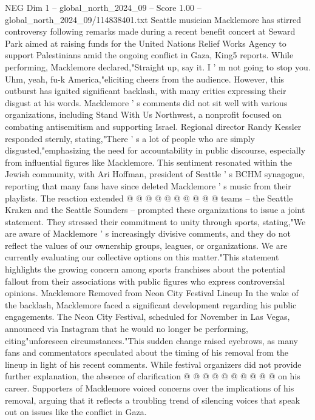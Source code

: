 \begin{textsample}{NEG Dim 1 – global\_north\_2024\_09 – Score 1.00 – global\_north\_2024\_09/114838401.txt}  \label{ex:f1_neg_021}
Seattle musician Macklemore has stirred controversy following remarks made during a recent benefit concert at Seward Park aimed at raising funds for the United Nations Relief Works Agency to support Palestinians amid the ongoing conflict in Gaza, King5 reports.
While performing, Macklemore declared,"Straight up, say it.
I ' m not going to stop you.
Uhm, yeah, fu-k America,"eliciting cheers from the audience.
However, this outburst has ignited significant backlash, with many critics expressing their disgust at his words.
Macklemore ' s comments did not sit well with various organizations, including Stand With Us Northwest, a nonprofit focused on combating antisemitism and supporting Israel.
Regional director Randy Kessler responded sternly, stating,"There ' s a lot of people who are simply disgusted,"emphasizing the need for accountability in public discourse, especially from influential figures like Macklemore.
This sentiment resonated within the Jewish community, with Ari Hoffman, president of Seattle ' s BCHM synagogue, reporting that many fans have since deleted Macklemore ' s music from their playlists.
The reaction extended @ @ @ @ @ @ @ @ @ @ teams -- the Seattle Kraken and the Seattle Sounders -- prompted these organizations to issue a joint statement.
They stressed their commitment to unity through sports, stating,"We are aware of Macklemore ' s increasingly divisive comments, and they do not reflect the values of our ownership groups, leagues, or organizations.
We are currently evaluating our collective options on this matter."This statement highlights the growing concern among sports franchises about the potential fallout from their associations with public figures who express controversial opinions.
Macklemore Removed from Neon City Festival Lineup In the wake of the backlash, Macklemore faced a significant development regarding his public engagements.
The Neon City Festival, scheduled for November in Las Vegas, announced via Instagram that he would no longer be performing, citing"unforeseen circumstances."This sudden change raised eyebrows, as many fans and commentators speculated about the timing of his removal from the lineup in light of his recent comments.
While festival organizers did not provide further explanation, the absence of clarification @ @ @ @ @ @ @ @ @ @ on his career.
Supporters of Macklemore voiced concerns over the implications of his removal, arguing that it reflects a troubling trend of silencing voices that speak out on issues like the conflict in Gaza.

\end{textsample}
